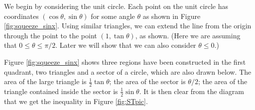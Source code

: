 \begin{solution}
{We begin by considering the unit circle. Each point on the unit circle has coordinates $(\cos \theta,\sin \theta)$ for some angle $\theta$ as shown in Figure \ref{fig:squeeze_sinx}. Using similar triangles, we can extend the line from the origin through the point to the point $(1,\tan \theta)$, as shown. (Here we are assuming that $0\leq \theta \leq \pi/2$. Later we will show that we can also consider $\theta \leq 0$.)


Figure \ref{fig:squeeze_sinx} shows three regions have been constructed in the first quadrant, two triangles and a sector of a circle, which are also drawn below. The area of the large triangle is $\frac12\tan\theta$; the area of the sector is $\theta/2$; the area of the triangle contained inside the sector is $\frac12\sin\theta$. It is then clear from the diagram that we get the inequality in Figure \ref{fig:STpic}. 




}
\end{solution}
